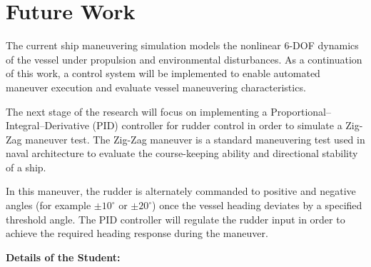 \documentclass[12pt,a4paper]{report}
\begin{document}
\chapter{Future Work}

The current ship maneuvering simulation models the nonlinear 6-DOF dynamics of the vessel under propulsion and environmental disturbances. As a continuation of this work, a control system will be implemented to enable automated maneuver execution and evaluate vessel maneuvering characteristics.

The next stage of the research will focus on implementing a Proportional–Integral–Derivative (PID) controller for rudder control in order to simulate a Zig-Zag maneuver test. The Zig-Zag maneuver is a standard maneuvering test used in naval architecture to evaluate the course-keeping ability and directional stability of a ship.

In this maneuver, the rudder is alternately commanded to positive and negative angles (for example $\pm 10^\circ$ or $\pm 20^\circ$) once the vessel heading deviates by a specified threshold angle. The PID controller will regulate the rudder input in order to achieve the required heading response during the maneuver.

\clearpage

\vspace*{1cm}
{\Large \textbf{Details of the Student:}}
\vspace{0.5cm}
\end{document}
